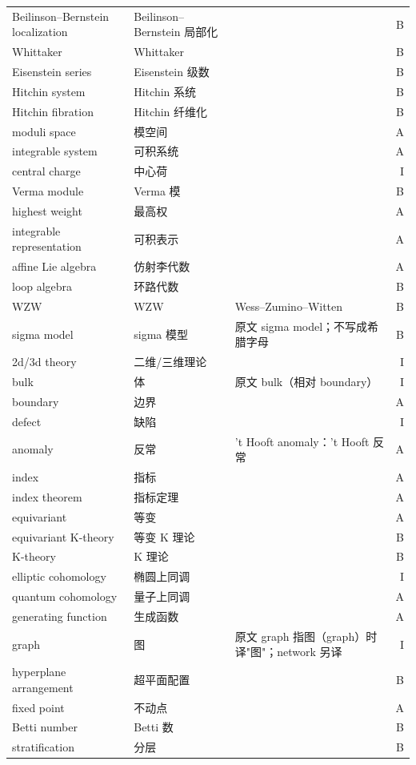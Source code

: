 \begin{longtable}{@{}>{\raggedright\arraybackslash}p{}>{\raggedright\arraybackslash}p{}>{\raggedright\arraybackslash}p{}@{\quad}r@{}}
Beilinson–Bernstein localization & Beilinson–Bernstein 局部化 &  & B\\
Whittaker & Whittaker &  & B\\
Eisenstein series & Eisenstein 级数 &  & B\\
Hitchin system & Hitchin 系统 &  & B\\
Hitchin fibration & Hitchin 纤维化 &  & B\\
moduli space & 模空间 &  & A\\
integrable system & 可积系统 &  & A\\
central charge & 中心荷 &  & I\\
Verma module & Verma 模 &  & B\\
highest weight & 最高权 &  & A\\
integrable representation & 可积表示 &  & A\\
affine Lie algebra & 仿射李代数 &  & A\\
loop algebra & 环路代数 &  & B\\
WZW & WZW & Wess–Zumino–Witten & B\\
sigma model & sigma 模型 & 原文 sigma model；不写成希腊字母 & B\\
2d/3d theory & 二维/三维理论 &  & I\\
bulk & 体 & 原文 bulk（相对 boundary） & I\\
boundary & 边界 &  & A\\
defect & 缺陷 &  & I\\
anomaly & 反常 & 't Hooft anomaly：'t Hooft 反常 & A\\
index & 指标 &  & A\\
index theorem & 指标定理 &  & A\\
equivariant & 等变 &  & A\\
equivariant K-theory & 等变 K 理论 &  & B\\
K-theory & K 理论 &  & B\\
elliptic cohomology & 椭圆上同调 &  & I\\
quantum cohomology & 量子上同调 &  & A\\
generating function & 生成函数 &  & A\\
graph & 图 & 原文 graph 指图（graph）时译"图"；network 另译 & I\\
hyperplane arrangement & 超平面配置 &  & B\\
fixed point & 不动点 &  & A\\
Betti number & Betti 数 &  & B\\
stratification & 分层 &  & B\\

\end{longtable}

